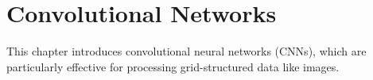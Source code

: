 
\chapter{Convolutional Networks}
\label{chap:convolutional-networks}

This chapter introduces convolutional neural networks (CNNs), which are particularly effective for processing grid-structured data like images.






